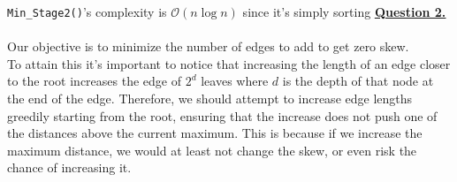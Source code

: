 \documentclass[12pt]{article}
\begin{document}
\texttt{Min\_Stage2()}'s complexity is $\mathcal{O}(n \log n)$ since it's simply sorting
\newpage
\hyperlink{toc}{\hypertarget{2}{\LARGE \underline{\textbf{Question 2.}}}}\\\\
Our objective is to minimize the number of edges to add to get zero skew.\\

To attain this it's important to notice that increasing the length of an edge closer to the root increases the edge of $2^d$ leaves
where $d$ is the depth of that node at the end of the edge. Therefore, we should attempt to increase edge lengths greedily starting from the root,
ensuring that the increase does not push one of the distances above the current maximum. This is because if we increase the maximum distance,
we would at least not change the skew, or even risk the chance of increasing it.\\
\end{document}
